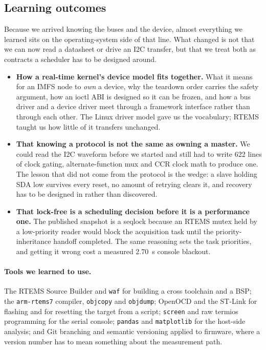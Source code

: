 \documentclass[10pt,a4]{article}
\begin{document}
\subsection{Learning outcomes}

Because we arrived knowing the buses and the device, almost everything we
learned sits on the operating-system side of that line. What changed is not that we can now read a datasheet
or drive an I2C transfer, but that we treat both as contracts a scheduler has to
be designed around.

\begin{itemize}
\item \textbf{How a real-time kernel's device model fits together.} What it
  means for an IMFS node to \emph{own} a device, why the teardown order carries
  the safety argument, how an ioctl ABI is designed so it can be frozen, and how
  a bus driver and a device driver meet through a framework interface rather
  than through each other. The Linux driver model gave us the vocabulary; RTEMS
  taught us how little of it transfers unchanged.
\item \textbf{That knowing a protocol is not the same as owning a master.} We
  could read the I2C waveform before we started and still had to write 622 lines
  of clock gating, alternate-function mux and CCR clock math to produce one. The
  lesson that did not come from the protocol is the wedge: a slave holding SDA
  low survives every reset, no amount of retrying clears it, and recovery has to
  be designed in rather than discovered.
\item \textbf{That lock-free is a scheduling decision before it is a performance
  one.} The published snapshot is a seqlock because an RTEMS mutex held by a
  low-priority reader would block the acquisition task until the
  priority-inheritance handoff completed. The same reasoning sets the task
  priorities, and getting it wrong cost a measured 2.70~s console blackout.
\end{itemize}

\paragraph{Tools we learned to use.} The RTEMS Source Builder and \texttt{waf}
for building a cross toolchain and a BSP; the \texttt{arm-rtems7} compiler,
\texttt{objcopy} and \texttt{objdump}; OpenOCD and the ST-Link for flashing and
for resetting the target from a script; \texttt{screen} and raw termios
programming for the serial console; \texttt{pandas} and \texttt{matplotlib} for
the host-side analysis; and Git branching and semantic versioning applied to
firmware, where a version number has to mean something about the measurement
path.
\end{document}

